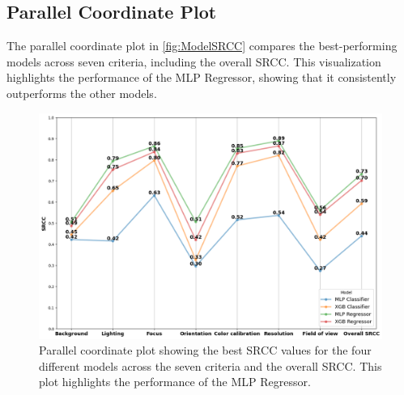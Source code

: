 \subsection{Parallel Coordinate Plot}
\label{subsec:ParallelCoordinatePlot}
The parallel coordinate plot in \autoref{fig:ModelSRCC} compares the best-performing models across seven criteria, including the overall SRCC. This visualization highlights the performance of the MLP Regressor, showing that it consistently outperforms the other models.\par
\begin{figure}[ht]
    \centering
    \includegraphics[keepaspectratio,width=15cm]{img/Model_SRCC.png}
    \caption{Parallel coordinate plot showing the best SRCC values for the four different models across the seven criteria and the overall SRCC. This plot highlights the performance of the MLP Regressor.}
    \label{fig:ModelSRCC}
\end{figure}

